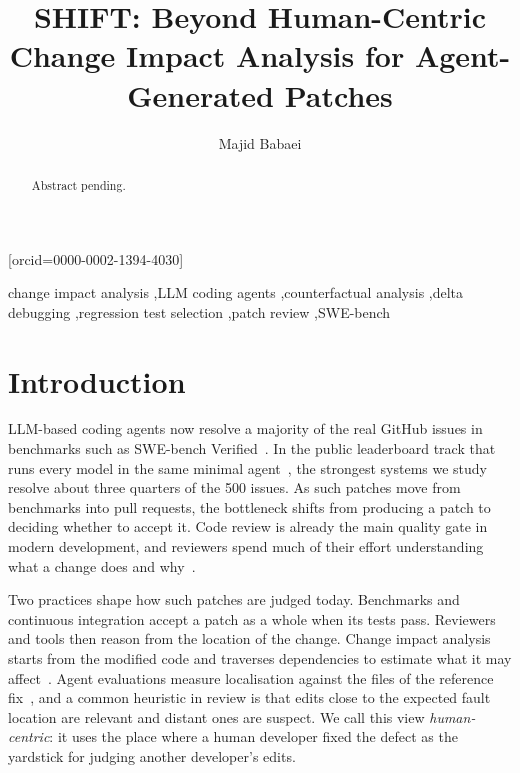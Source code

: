 \documentclass[a4paper,fleqn]{cas-sc}
\begin{document}
\let\WriteBookmarks\relax
{}
\title[mode=title]{SHIFT: Beyond Human-Centric Change Impact Analysis for Agent-Generated Patches}
\author[1]{Majid Babaei}[orcid=0000-0002-1394-4030]
\cormark[1]

\begin{abstract}
Abstract pending.
\end{abstract}

\begin{keywords}
change impact analysis \sep LLM coding agents \sep counterfactual analysis \sep delta debugging \sep regression test selection \sep patch review \sep SWE-bench
\end{keywords}
\maketitle
\raggedbottom

\section{Introduction}\label{sec:intro}

LLM-based coding agents now resolve a majority of the real GitHub issues in benchmarks such as SWE-bench Verified~\citep{jimenez2024swebench,chowdhury2024verified}. In the public leaderboard track that runs every model in the same minimal agent~\citep{miniswe2025}, the strongest systems we study resolve about three quarters of the 500 issues. As such patches move from benchmarks into pull requests, the bottleneck shifts from producing a patch to deciding whether to accept it. Code review is already the main quality gate in modern development, and reviewers spend much of their effort understanding what a change does and why~\citep{bacchelli2013expectations}.

Two practices shape how such patches are judged today. Benchmarks and continuous integration accept a patch as a whole when its tests pass. Reviewers and tools then reason from the location of the change. Change impact analysis starts from the modified code and traverses dependencies to estimate what it may affect~\citep{bohner1996cia,li2013cia,ren2004chianti}. Agent evaluations measure localisation against the files of the reference fix~\citep{xia2025agentless}, and a common heuristic in review is that edits close to the expected fault location are relevant and distant ones are suspect. We call this view \emph{human-centric}: it uses the place where a human developer fixed the defect as the yardstick for judging another developer's edits.
\end{document}
